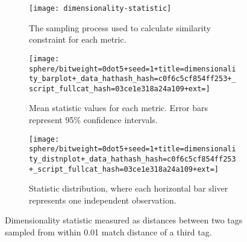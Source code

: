 \begin{figure*}
\begin{center}

\begin{minipage}{0.15\linewidth}
\begin{subfigure}[b]{\linewidth}
\texttt{[image: dimensionality-statistic]}
\caption{
The sampling process used to calculate similarity constraint for each metric.
}
\end{subfigure}
\end{minipage}%
\begin{minipage}{0.35\textwidth}
\begin{subfigure}[b]{\linewidth}
\centering
\texttt{[image: sphere/bitweight=0dot5+seed=1+title=dimensionality\_barplot+\_data\_hathash\_hash=c0f6c5cf854ff253+\_script\_fullcat\_hash=03ce1e318a24a109+ext=]}
\caption{
Mean statistic values for each metric.
Error bars represent 95\% confidence intervals.
}
\label{fig:sphere_distnplot}
\end{subfigure}
\end{minipage}%
\begin{minipage}{0.5\linewidth}
\begin{subfigure}[b]{\linewidth}
\centering
\texttt{[image: sphere/bitweight=0dot5+seed=1+title=dimensionality\_distnplot+\_data\_hathash\_hash=c0f6c5cf854ff253+\_script\_fullcat\_hash=03ce1e318a24a109+ext=]}
\caption{
Statistic distribution, where each horizontal bar sliver represents one independent observation.
}
\label{fig:sphere_barplot}
\end{subfigure}
\end{minipage}

\caption{
Dimensionality statistic measured as distances between two tags sampled from within 0.01 match distance of a third tag.
}
\label{fig:sphere}

\end{center}
\end{figure*}

